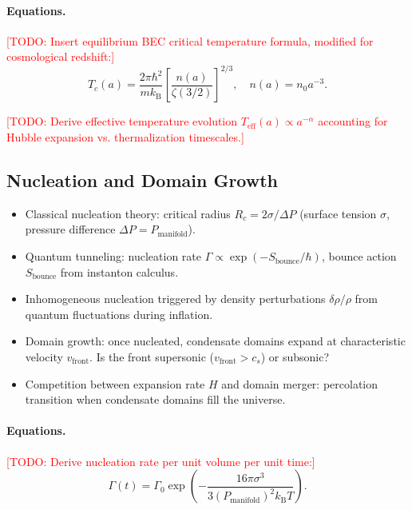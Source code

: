 \documentclass[11pt,a4paper]{article}
\newcommand{\kB}{\ensuremath{k_{\mathrm{B}}}}
\newcommand{\Pmanifold}{\ensuremath{P_{\mathrm{manifold}}}}
\newcommand{\Tc}{\ensuremath{T_c}}
\theoremstyle{definition}
\theoremstyle{remark}
\begin{document}
\paragraph{Equations.}
\textcolor{red}{[TODO: Insert equilibrium BEC critical temperature formula, modified for cosmological redshift:]}
\begin{equation}
\Tc(a) = \frac{2\pi\hbar^2}{m\kB} \left[ \frac{n(a)}{\zeta(3/2)} \right]^{2/3}, \quad n(a) = n_0 a^{-3}.
\label{eq:Tc_cosmo}
\end{equation}

\textcolor{red}{[TODO: Derive effective temperature evolution $T_{\mathrm{eff}}(a) \propto a^{-\alpha}$ accounting for Hubble expansion vs. thermalization timescales.]}

\subsection{Nucleation and Domain Growth}
\label{sec:nucleation}

\begin{itemize}[leftmargin=*, itemsep=0.3em]
\item Classical nucleation theory: critical radius $R_c = 2\sigma/\Delta P$ (surface tension $\sigma$, pressure difference $\Delta P = \Pmanifold$).
\item Quantum tunneling: nucleation rate $\Gamma \propto \exp(-S_{\mathrm{bounce}}/\hbar)$, bounce action $S_{\mathrm{bounce}}$ from instanton calculus.
\item Inhomogeneous nucleation triggered by density perturbations $\delta\rho/\rho$ from quantum fluctuations during inflation.
\item Domain growth: once nucleated, condensate domains expand at characteristic velocity $v_{\mathrm{front}}$. Is the front supersonic ($v_{\mathrm{front}} > c_s$) or subsonic?
\item Competition between expansion rate $H$ and domain merger: percolation transition when condensate domains fill the universe.
\end{itemize}

\paragraph{Equations.}
\textcolor{red}{[TODO: Derive nucleation rate per unit volume per unit time:]}
\begin{equation}
\Gamma(t) = \Gamma_0 \exp\left( -\frac{16\pi\sigma^3}{3(\Pmanifold)^2 \kB T} \right).
\label{eq:nucleation_rate}
\end{equation}
\end{document}
